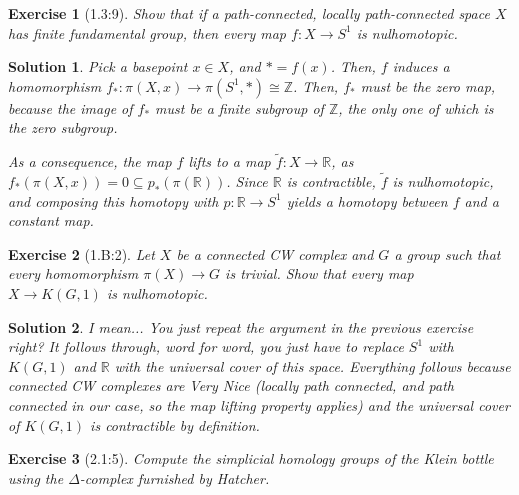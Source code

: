 \documentclass{article}
\theoremstyle{plain}
\newtheorem*{ex}{Exercise}
\theoremstyle{nonumberplain}
\newtheorem{sol}{Solution}
\newcommand{\R}{\mathbb{R}}
\newcommand{\Z}{\mathbb{Z}}
\begin{document}
\begin{ex}[1.3:9]
Show that if a path-connected, locally path-connected space $X$ has finite fundamental group, then every map $f \colon X \to S^1$ is nulhomotopic.
\end{ex}

\begin{sol}
Pick a basepoint $x \in X$, and $* = f(x)$. Then, $f$ induces a homomorphism $f_* \colon \pi(X,x) \to \pi(S^1,*) \cong \Z$. Then, $f_*$ must be the zero map, because the image of $f_*$ must be a finite subgroup of $\Z$, the only one of which is the zero subgroup.

As a consequence, the map $f$ lifts to a map $\tilde f \colon X \to \R$, as $f_*(\pi(X,x)) = 0 \subseteq p_*(\pi(\R))$. Since $\R$ is contractible, $\tilde f$ is nulhomotopic, and composing this homotopy with $p \colon \R \to S^1$ yields a homotopy between $f$ and a constant map.
\end{sol}

\begin{ex}[1.B:2]
Let $X$ be a connected CW complex and $G$ a group such that every homomorphism $\pi(X) \to G$ is trivial. Show that every map $X \to K(G,1)$ is nulhomotopic.
\end{ex}

\begin{sol}
I mean... You just repeat the argument in the previous exercise right? It follows through, word for word, you just have to replace $S^1$ with $K(G,1)$ and $\R$ with the universal cover of this space. Everything follows because connected CW complexes are Very Nice (locally path connected, and path connected in our case, so the map lifting property applies) and the universal cover of $K(G,1)$ is contractible by definition.
\end{sol}

\begin{ex}[2.1:5]
Compute the simplicial homology groups of the Klein bottle using the $\Delta$-complex furnished by Hatcher.
\end{ex}
\end{document}

